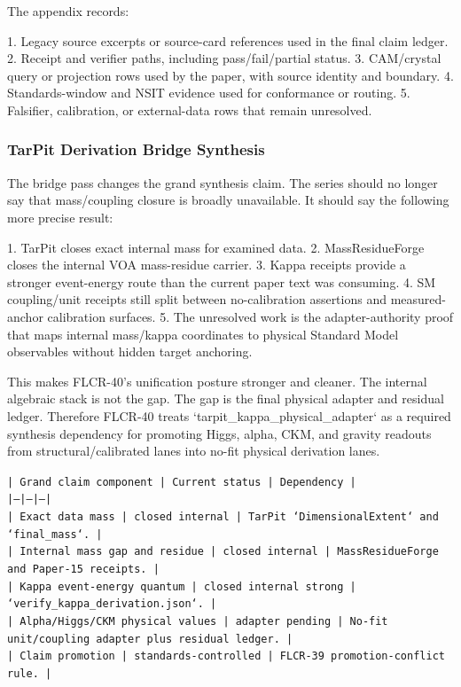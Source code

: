 \documentclass[11pt]{article}
\begin{document}
The appendix records:

1. Legacy source excerpts or source-card references used in the final claim ledger.
2. Receipt and verifier paths, including pass/fail/partial status.
3. CAM/crystal query or projection rows used by the paper, with source identity and boundary.
4. Standards-window and NSIT evidence used for conformance or routing.
5. Falsifier, calibration, or external-data rows that remain unresolved.

\subsubsection*{TarPit Derivation Bridge Synthesis}

The bridge pass changes the grand synthesis claim. The series should no longer say that mass/coupling closure is broadly unavailable. It should say the following more precise result:

1. TarPit closes exact internal mass for examined data.
2. MassResidueForge closes the internal VOA mass-residue carrier.
3. Kappa receipts provide a stronger event-energy route than the current paper text was consuming.
4. SM coupling/unit receipts still split between no-calibration assertions and measured-anchor calibration surfaces.
5. The unresolved work is the adapter-authority proof that maps internal mass/kappa coordinates to physical Standard Model observables without hidden target anchoring.

This makes FLCR-40's unification posture stronger and cleaner. The internal algebraic stack is not the gap. The gap is the final physical adapter and residual ledger. Therefore FLCR-40 treats `tarpit\_kappa\_physical\_adapter` as a required synthesis dependency for promoting Higgs, alpha, CKM, and gravity readouts from structural/calibrated lanes into no-fit physical derivation lanes.

\noindent\texttt{| Grand claim component | Current status | Dependency |}\\
\noindent\texttt{|---|---|---|}\\
\noindent\texttt{| Exact data mass | closed internal | TarPit `DimensionalExtent` and `final\_mass`. |}\\
\noindent\texttt{| Internal mass gap and residue | closed internal | MassResidueForge and Paper-15 receipts. |}\\
\noindent\texttt{| Kappa event-energy quantum | closed internal strong | `verify\_kappa\_derivation.json`. |}\\
\noindent\texttt{| Alpha/Higgs/CKM physical values | adapter pending | No-fit unit/coupling adapter plus residual ledger. |}\\
\noindent\texttt{| Claim promotion | standards-controlled | FLCR-39 promotion-conflict rule. |}\\
\end{document}
